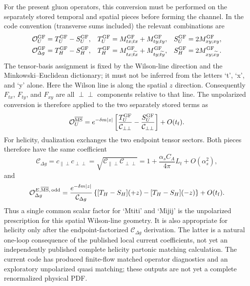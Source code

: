 \documentclass[11pt]{article}
\numberwithin{equation}{section}
\newcommand{\tf}{t_{\mathrm f}}
\begin{document}
For the present gluon operators, this conversion must be performed on the
separately stored temporal and spatial pieces before forming the channel.  In
the code convention (transverse sums included) the relevant combinations are
\begin{align}
 \mathcal O_U^{\rm GF}&=T_U^{\rm GF}-S_U^{\rm GF},
 &T_U^{\rm GF}&=M_{tx;tx}^{\rm GF}+M_{ty;ty}^{\rm GF},
 &S_U^{\rm GF}&=2M_{xy;xy}^{\rm GF},\\
 \mathcal O_{\Delta g}^{\rm GF}&=T_H^{\rm GF}-S_H^{\rm GF},
 &T_H^{\rm GF}&=M_{tx;\widetilde{tx}}^{\rm GF}+M_{ty;\widetilde{ty}}^{\rm GF},
 &S_H^{\rm GF}&=2M_{xy;\widetilde{xy}}^{\rm GF}.
\end{align}
The tensor-basis assignment is fixed by the Wilson-line direction and the
Minkowski--Euclidean dictionary; it must not be inferred from the letters
`t', `x', and `y' alone.  Here the Wilson line is along the spatial $z$
direction.  Consequently $F_{tx}$, $F_{ty}$, and $F_{xy}$ are all
$\perp\perp$ components relative to that line.  The unpolarized conversion
is therefore applied to the two separately stored terms as
\begin{equation}
 \mathcal O_U^{\overline{\rm MS}}
 =e^{-\delta m|z|}
 \left[
 \frac{T_U^{\rm GF}}{\mathcal C_{\perp\perp}}
 -\frac{S_U^{\rm GF}}{\mathcal C_{\perp\perp}}
 \right]+O(\tf).
 \label{eq:gluon-unpolarized-flow-matching}
\end{equation}
For helicity, dualization exchanges the two endpoint tensor sectors.  Both
pieces therefore have the same coefficient
\begin{equation}
 \mathcal C_{\Delta g}
 =c_{\parallel\perp}c_{\perp\perp}
 =\sqrt{\mathcal C_{\parallel\perp}\mathcal C_{\perp\perp}}
 =1+\frac{\alpha_s C_A}{4\pi}L_t+O(\alpha_s^2),
 \label{eq:gluon-helicity-flow-coefficient}
\end{equation}
and
\begin{equation}
 \mathcal O_{\Delta g}^{E,\overline{\rm MS},\,\mathrm{odd}}
 =\frac{e^{-\delta m|z|}}{\mathcal C_{\Delta g}}
 \left\{[T_H-S_H](+z)-[T_H-S_H](-z)\right\}+O(\tf).
 \label{eq:gluon-helicity-flow-matching}
\end{equation}
Thus a single common scalar factor for `Mtiti' and `Mijij' is the
unpolarized prescription for this spatial Wilson-line geometry.  It is also
appropriate for helicity only after the endpoint-factorized
$\mathcal C_{\Delta g}$ derivation.  The latter is a
natural one-loop consequence of the published local current coefficients,
not yet an independently published complete helicity partonic matching
calculation.  The current code has produced finite-flow matched operator
diagnostics and an exploratory unpolarized quasi matching; these outputs are
not yet a complete renormalized physical PDF.
\end{document}
